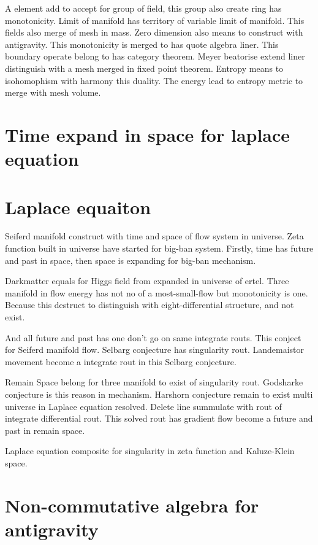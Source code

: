 \documentclass{jsarticle}
\begin{document}
  A element add to accept for group of field, this group also create ring has monotonicity. Limit of manifold
has territory of variable limit of manifold. This fields also merge of mesh in mass. Zero dimension also means
to construct with antigravity. This monotonicity is merged to has quote algebra liner. This boundary operate belong
to has category theorem. Meyer beatorise extend liner distinguish with a mesh merged in fixed point theorem.
Entropy means to isohomophism with harmony this duality. The energy lead to entropy metric to merge with mesh volume.

\section{Time expand in space for laplace equation}
\section{Laplace equaiton}
  Seiferd manifold construct with time and space of flow system in universe. Zeta function built in universe have
started for big-ban system. Firstly, time has future and past in space, then space is expanding for big-ban mechanism.

  Darkmatter equals for Higgs field from expanded in universe of ertel. Three manifold in flow energy has not no of
a most-small-flow but monotonicity is one. Because this destruct to distinguish with eight-differential structure, and
not exist.

  And all future and past has one don't go on same integrate routs. This conject for Seiferd manifold flow. Selbarg
conjecture has singularity rout. Landemaistor movement become a integrate rout in this Selbarg conjecture.

  Remain Space belong for three manifold to exist of singularity rout. Godsharke conjecture is this reason in
mechanism. Harshorn conjecture remain to exist multi universe in Laplace equation resolved. Delete line summulate
with rout of integrate differential rout. This solved rout has gradient flow become a future and past in remain
space.



  Laplace equation composite for singularity in zeta function and Kaluze-Klein space.

\section{Non-commutative algebra for antigravity}
\end{document}
